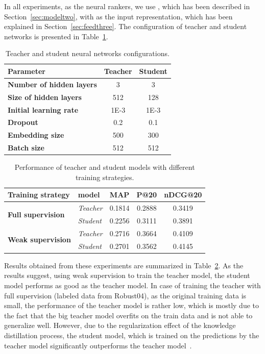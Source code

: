 In all experiments, as the neural rankers, we use \modeltwo, which has been described in Section~\ref{sec:modeltwo}, with \Feedthree as the input representation, which has been explained in Section~\ref{sec:feedthree}.
The configuration of teacher and student networks is presented in Table~\ref{tbl:cfg}.
\begin{table}[t]
\centering
\caption{Teacher and student neural networks configurations.}
\begin{tabular}{lcc} 
\toprule
\bf Parameter & \bf Teacher & \bf Student  \\
\midrule
\textbf{Number of hidden layers} & 3 & 3  \\
\textbf{Size of hidden layers} & 512 & 128 \\
\textbf{Initial learning rate} & 1E-3 & 1E-3 \\
\textbf{Dropout} & 0.2 & 0.1 \\
\textbf{Embedding size} & 500 & 300 \\
\textbf{Batch size} & 512 & 512  \\
\bottomrule
\end{tabular}
\label{tbl:cfg}
\end{table}

\begin{table}[t]
\centering
\caption{\label{tbl_res1}Performance of teacher and student models with different training strategies.}
\vspace{5pt}
\begin{adjustbox}{max width=\textwidth}
\begin{tabular}{l l c c c}
\toprule
\bf Training strategy & \bf model & \textbf{MAP} & \textbf{P@20} & \textbf{nDCG@20} 
\\ \midrule
\multirow{2}{*}{{\textbf{Full supervision}}} & {\textit{Teacher}} 
& 0.1814 & 0.2888 & 0.3419 
\\
& {\textit{Student}} 
& 0.2256 & 0.3111 & 0.3891 
\\ \midrule
\multirow{2}{*}{{\textbf{Weak supervision}}} & {\textit{Teacher}} 
& 0.2716 & 0.3664 & 0.4109 
\\ 
& {\textit{Student}} 
& 0.2701 & 0.3562 & 0.4145 
\\ \bottomrule
\end{tabular}
\end{adjustbox}
\end{table}

Results obtained from these experiments are summarized in Table~\ref{tbl_res1}. As the results suggest, using weak supervision to train the teacher model, the student model performs as good as the teacher model. In case of training the teacher with full supervision (labeled data from Robust04), as the original training data is small, the performance of the teacher model is rather low, which is mostly due to the fact that the big teacher model overfits on the train data and is not able to generalize well. 
However, due to the regularization effect of the knowledge distillation process, the student model, which is trained on the predictions by the teacher model significantly outperforms the teacher model~\citep{Hinton:2015,Romero:2014}.

